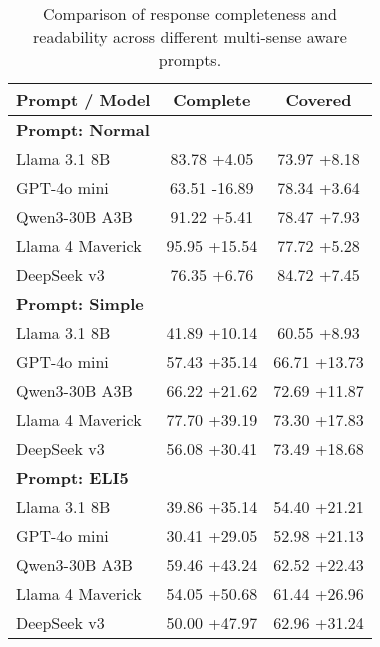 \documentclass{article}%
\begin{document}
%
\normalsize%


\begin{table}[h!]%
\centering%
\small%
\begin{tabular}{@{}l c c@{}}%
\toprule%
\textbf{Prompt / Model}&\textbf{Complete}&\textbf{Covered}\\%
\midrule%
\multicolumn{3}{l}{\textbf{Prompt: Normal}} \\%
Llama 3.1 8B&83.78 \textcolor{own_green}{+4.05}&73.97 \textcolor{own_green}{+8.18}\\%
GPT{-}4o mini&63.51 \textcolor{own_red}{-16.89}&78.34 \textcolor{own_green}{+3.64}\\%
Qwen3{-}30B A3B&91.22 \textcolor{own_green}{+5.41}&78.47 \textcolor{own_green}{+7.93}\\%
Llama 4 Maverick&95.95 \textcolor{own_green}{+15.54}&77.72 \textcolor{own_green}{+5.28}\\%
DeepSeek v3&76.35 \textcolor{own_green}{+6.76}&84.72 \textcolor{own_green}{+7.45}\\%
\midrule%
\multicolumn{3}{l}{\textbf{Prompt: Simple}} \\%
Llama 3.1 8B&41.89 \textcolor{own_green}{+10.14}&60.55 \textcolor{own_green}{+8.93}\\%
GPT{-}4o mini&57.43 \textcolor{own_green}{+35.14}&66.71 \textcolor{own_green}{+13.73}\\%
Qwen3{-}30B A3B&66.22 \textcolor{own_green}{+21.62}&72.69 \textcolor{own_green}{+11.87}\\%
Llama 4 Maverick&77.70 \textcolor{own_green}{+39.19}&73.30 \textcolor{own_green}{+17.83}\\%
DeepSeek v3&56.08 \textcolor{own_green}{+30.41}&73.49 \textcolor{own_green}{+18.68}\\%
\midrule%
\multicolumn{3}{l}{\textbf{Prompt: ELI5}} \\%
Llama 3.1 8B&39.86 \textcolor{own_green}{+35.14}&54.40 \textcolor{own_green}{+21.21}\\%
GPT{-}4o mini&30.41 \textcolor{own_green}{+29.05}&52.98 \textcolor{own_green}{+21.13}\\%
Qwen3{-}30B A3B&59.46 \textcolor{own_green}{+43.24}&62.52 \textcolor{own_green}{+22.43}\\%
Llama 4 Maverick&54.05 \textcolor{own_green}{+50.68}&61.44 \textcolor{own_green}{+26.96}\\%
DeepSeek v3&50.00 \textcolor{own_green}{+47.97}&62.96 \textcolor{own_green}{+31.24}\\\bottomrule%
%
\end{tabular}%
\caption{Comparison of response completeness and readability across different multi{-}sense aware prompts.}%
\end{table}

%
\end{document}
